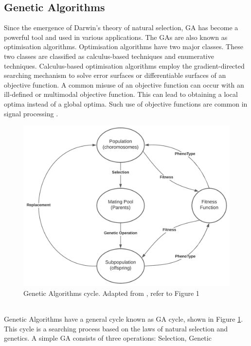 \documentclass[a4paper, 11pt]{article}
\begin{document}
    \subsection{Genetic Algorithms}\label{sec:bg_sub2}
    Since the emergence of Darwin's theory of natural selection, GA has become a powerful tool and used in various
    applications.  The GAs are also known as optimisation algorithms. Optimisation algorithms have two major classes.
    These two classes are classified as calculus-based techniques and enumerative techniques. Calculus-based
    optimisation algorithms employ the gradient-directed searching mechanism to solve error surfaces or differentiable
    surfaces of an objective function. A common misuse of an objective function can occur with an ill-defined or multimodal
    objective function. This can lead to obtaining a local optima instead of a global optima. Such use of objective
    functions are common in signal processing \cite{Tang1996}.
    \linebreak
    \begin{figure}[h!]
        \centering
        \graphicspath{{./wiki/}}
        \includegraphics[scale=0.7]{GA_cycle.png}
        \caption{Genetic Algorithms cycle. Adapted from \cite{Tang1996}, refer to Figure 1}
        \label{Fig:GA_cycle}
    \end{figure}
    \\
    Genetic Algorithms have a general cycle known as GA cycle, shown in Figure \ref{Fig:GA_cycle}. This cycle is a searching
    process  based on the laws of natural selection and genetics. A simple GA consists of three operations: Selection, Genetic
\end{document}
